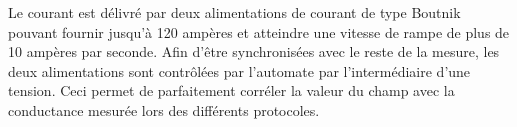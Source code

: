 Le courant est délivré par deux alimentations de courant de type Boutnik pouvant fournir jusqu’à 120 ampères et atteindre une vitesse de rampe de plus de 10 ampères par seconde. Afin d’être synchronisées avec le reste de la mesure, les deux alimentations sont contrôlées par l’automate par l’intermédiaire d’une tension. Ceci permet de parfaitement corréler la valeur du champ avec la conductance mesurée lors des différents protocoles.

